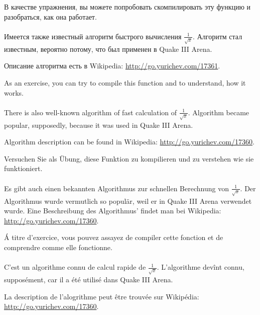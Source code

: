 \ifdefined\RUSSIAN
В качестве упражнения, вы можете попробовать скомпилировать эту функцию и разобраться, как она работает. \\
\\
Имеется также известный алгоритм быстрого вычисления $\frac{1}{\sqrt{x}}$.
Алгоритм стал известным, вероятно потому, что был применен в Quake III Arena.

Описание алгоритма есть в Wikipedia: \url{http://go.yurichev.com/17361}.
\fi %

\ifdefined\ENGLISH
As an exercise, you can try to compile this function and to understand, how it works. \\
\\
There is also well-known algorithm of fast calculation of $\frac{1}{\sqrt{x}}$.
Algorithm became popular, supposedly, because it was used in Quake III Arena.

Algorithm description can be found in Wikipedia: \url{http://go.yurichev.com/17360}.
\fi %

\ifdefined\GERMAN
Versuchen Sie als Übung, diese Funktion zu kompilieren und zu verstehen wie sie funktioniert.\\\\
Es gibt auch einen bekannten Algorithmus zur schnellen Berechnung von $\frac{1}{\sqrt{x}}$.
Der Algorithmus wurde vermutlich so populär, weil er in Quake III Arena verwendet wurde.
Eine Beschreibung des Algorithmus' findet man bei Wikipedia: \url{http://go.yurichev.com/17360}.
\fi %

\ifdefined\FRENCH
Á titre d'exercice, vous pouvez assayez de compiler cette fonction et de comprendre
comme elle fonctionne.\\
\\
C'est un algorithme connu de calcul rapide de $\frac{1}{\sqrt{x}}$.
L'algorithme devînt connu, supposément, car il a été utilisé dans Quake III Arena.

La description de l'alogrithme peut être trouvée sur Wikipédia: \url{http://go.yurichev.com/17360}.
\fi %

